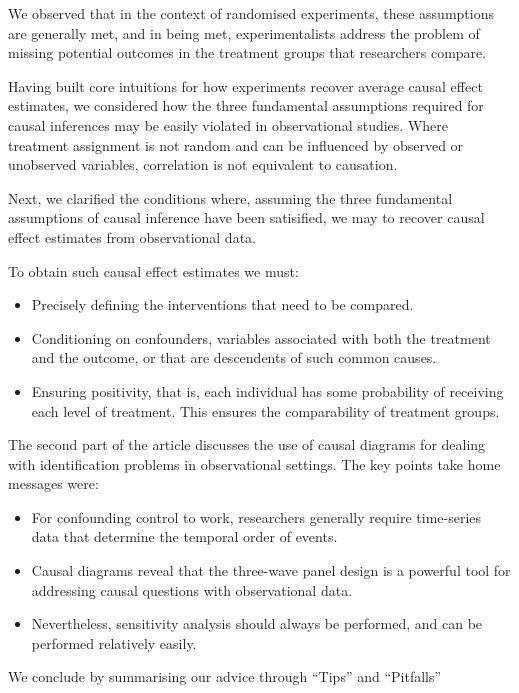 \documentclass[
  singlecolumn]{article}
\providecommand{\tightlist}{%
  \setlength{\itemsep}{0pt}\setlength{\parskip}{0pt}}\usepackage{longtable,booktabs,array}
\begin{document}
We observed that in the context of randomised experiments, these
assumptions are generally met, and in being met, experimentalists
address the problem of missing potential outcomes in the treatment
groups that researchers compare.

Having built core intuitions for how experiments recover average causal
effect estimates, we considered how the three fundamental assumptions
required for causal inferences may be easily violated in observational
studies. Where treatment assignment is not random and can be influenced
by observed or unobserved variables, correlation is not equivalent to
causation.

Next, we clarified the conditions where, assuming the three fundamental
assumptions of causal inference have been satisified, we may to recover
causal effect estimates from observational data.

To obtain such causal effect estimates we must:

\begin{itemize}
\tightlist
\item
  Precisely defining the interventions that need to be compared.
\item
  Conditioning on confounders, variables associated with both the
  treatment and the outcome, or that are descendents of such common
  causes.
\item
  Ensuring positivity, that is, each individual has some probability of
  receiving each level of treatment. This ensures the comparability of
  treatment groups.
\end{itemize}

The second part of the article discusses the use of causal diagrams for
dealing with identification problems in observational settings. The key
points take home messages were:

\begin{itemize}
\tightlist
\item
  For confounding control to work, researchers generally require
  time-series data that determine the temporal order of events.
\item
  Causal diagrams reveal that the three-wave panel design is a powerful
  tool for addressing causal questions with observational data.
\item
  Nevertheless, sensitivity analysis should always be performed, and can
  be performed relatively easily.
\end{itemize}

We conclude by summarising our advice through ``Tips'' and ``Pitfalls''
\end{document}
